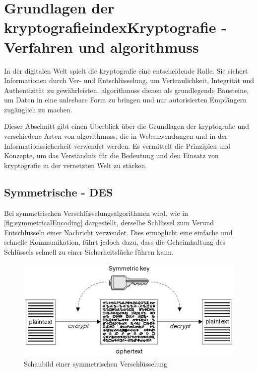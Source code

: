 \newpage


\section[Grundlagen der Kryptografie - Kryptografische Verfahren und Algorithmen]{Grundlagen der \gls{kryptografie}index{Kryptografie} -  Verfahren und \glspl{algorithmus}}\label{sec:grundlagen-der-kryptografie}


In der digitalen Welt spielt die \Gls{kryptografie} eine entscheidende Rolle.
Sie sichert Informationen durch Ver- und Entschlüsselung, um Vertraulichkeit, Integrität und Authentizität zu gewährleisten.
 \glspl{algorithmus} dienen als grundlegende Bausteine, um Daten in eine unlesbare Form zu bringen und nur autorisierten Empfängern zugänglich zu machen.

Dieser Abschnitt gibt einen Überblick über die Grundlagen der \Gls{kryptografie} und verschiedene Arten von \glspl{algorithmus}, die in Webanwendungen und in der Informationssicherheit verwendet werden.
Es vermittelt die Prinzipien und Konzepte, um das Verständnis für die Bedeutung und den Einsatz von \Gls{kryptografie} in der vernetzten Welt zu stärken.


\subsection[Symmetrische Verschlüsselungsalgorithmen]{Symmetrische  - \acf{DES}}\label{subsec:symmetrsiche-algorithmen}
Bei symmetrischen Verschlüsselungsalgorithmen wird, wie in \autoref{fig:symmetricalEncoding}\autocite{Chapter211:online} dargestellt, derselbe Schlüssel zum Ver\nonbreakdash und Entschlüsseln einer Nachricht verwendet.
Dies ermöglicht eine einfache und schnelle Kommunikation, führt jedoch dazu, dass die Geheimhaltung des Schlüssels schnell zu einer Sicherheitslücke führen kann.

\begin{figure}[htbp]
    \includegraphics[width=1\linewidth]{abbildungen/symmetricEncoding}
    \centering
    \caption[
        Schaubild einer symmetrischen Verschlüsselung]{Schaubild einer symmetrischen Verschlüsselung\footnotemark}
    \label{fig:symmetricalEncoding}
\end{figure}\ 


